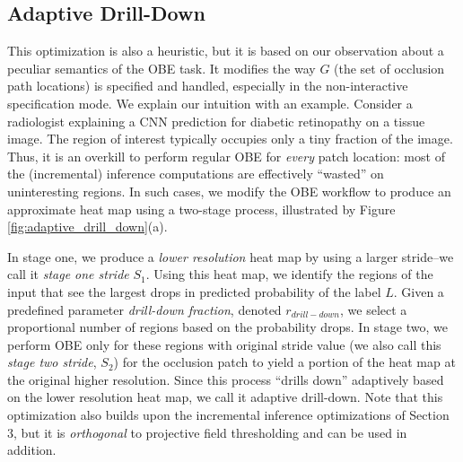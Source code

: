 \subsection{Adaptive Drill-Down}\label{sec:ada-drill-down}
This optimization is also a heuristic, but it is based on our observation about a peculiar semantics of the OBE task. It modifies the way $G$ (the set of occlusion path locations) is specified and handled, especially in the non-interactive specification mode. We explain our intuition with an example. Consider a radiologist explaining a CNN prediction for diabetic retinopathy on a tissue image. The region of interest typically occupies only a tiny fraction of the image. Thus, it is an overkill to perform regular OBE for \textit{every} patch location: most of the (incremental) inference computations are effectively ``wasted'' on uninteresting regions. In such cases, we modify the OBE workflow to produce an approximate heat map using a two-stage process, illustrated by Figure \ref{fig:adaptive_drill_down}(a).

In stage one, we produce a \textit{lower resolution} heat map by using a larger stride--we call it \textit{stage one stride} $S_1$. Using this heat map, we identify the regions of the input that see the largest drops in predicted probability of the label $L$. Given a predefined parameter \textit{drill-down fraction}, denoted $r_{drill-down}$, we select a proportional number of regions based on the probability drops. In stage two, we perform OBE only for these regions with original stride value (we also call this \textit{stage two stride}, $S_2$) for the occlusion patch to yield a portion of the heat map at the original higher resolution. Since this process ``drills down'' adaptively based on the lower resolution heat map, we call it adaptive drill-down. Note that this optimization also builds upon the incremental inference optimizations of Section 3, but it is \textit{orthogonal} to projective field thresholding and can be used in addition.


